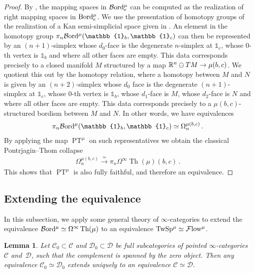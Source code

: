 \documentclass[10pt]{amsart}
\numberwithin{equation}{section}
\newtheorem{lem}[prop]{Lemma}
\theoremstyle{definition}
\DeclareMathOperator{\Th}{Th}
\DeclareMathOperator{\PT}{PT}
\newcommand{\Flow}{\cF\mathrm{low}\vphantom{w}}
\newcommand{\Bord}{\mathcal{B}\mathrm{ord}\vphantom{d}}
\newcommand{\PreBord}{\mathrm{Bord}\vphantom{d}}
\newcommand{\TwSp}{\mathrm{TwSp}\vphantom{h}}
\newcommand{\bR}{\mathbb{R}}
\newcommand{\bOne}{\mathbb{1}}
\newcommand{\cC}{\mathcal{C}}
\newcommand{\calD}{\mathcal{D}}
\newcommand{\cF}{\mathcal{F}}
\renewcommand{\to}{\mathchoice{\longrightarrow}{\rightarrow}{}{}}
\begin{document}
\begin{proof}
	By , the mapping spaces in $\Bord^{\mu}_{e}$ can be computed as the realization of right mapping spaces in $\PreBord_{e}^{\mu}$.
  We use the presentation of homotopy groups of the realization of a Kan semi-simplicial space given in \cite{lurie2011ltheory}.
  An element in the homotopy group $\pi_{n} \Bord^{\mu}(\bOne_{b}, \bOne_{c})$ can then be represented by an $(n+1)$-simplex whose $d_{0}$-face is the degenerate $n$-simplex at $\bOne_{c}$, whose 0-th vertex is $\bOne_{b}$ and where all other faces are empty.
  This data corresponds precisely to a closed manifold $M$ structured by a map $\bR^{n}\ominus TM \to \mu(b,c)$.
  We quotient this out by the homotopy relation, where a homotopy between $M$ and $N$ is given by an $(n+2)$-simplex whose $d_0$ face is the degenerate $(n+1)$-simplex at $\bOne_{c}$, whose 0-th vertex is $\bOne_{b}$, whose $d_{1}$-face is $M$, whose $d_{2}$-face is $N$ and where all other faces are empty.
  This data corresponds precisely to a $\mu(b,c)$-structured bordism between $M$ and $N$.
  In other words, we have equivalences
	\begin{align*}
		\pi_{n} \Bord^{\mu}(\bOne_{b}, \bOne_{c}) \simeq \Omega_{n}^{\mu(b,c)} \,.
	\end{align*}
	By applying the map $\PT^{\mu}$ on such representatives we obtain the classical Pontrjagin--Thom collapse
	\begin{align*}
		\Omega_{n}^{\mu(b,c)} \xrightarrow{\simeq} \pi_{n} \Omega^{\infty} \Th(\mu)(b,c) \,.
	\end{align*}
	This shows that $\PT^{\mu}$ is also fully faithful, and therefore an equivalence.
\end{proof}


\subsection{Extending the equivalence}\label{subsec:rigidity}

In this subsection, we apply some general theory of $\infty$-categories to extend the equivalence $\Bord^{\mu} \simeq \Omega^{\infty}\Th(\mu)$ to an equivalence $\TwSp^{\mu} \simeq \Flow^{\mu}$.

\begin{lem}\label{lem:zero_is_unique}
	Let $\cC_0 \subset \cC$ and $\calD_{0} \subset \calD$ be full subcategories of pointed $\infty$-categories~$\cC$ and~$\calD$, such that the complement is spanned by the zero object.
	Then any equivalence $\cC_{0} \simeq \calD_{0}$ extends uniquely to an equivalence $\cC \simeq \calD$.
\end{lem}
\end{document}
